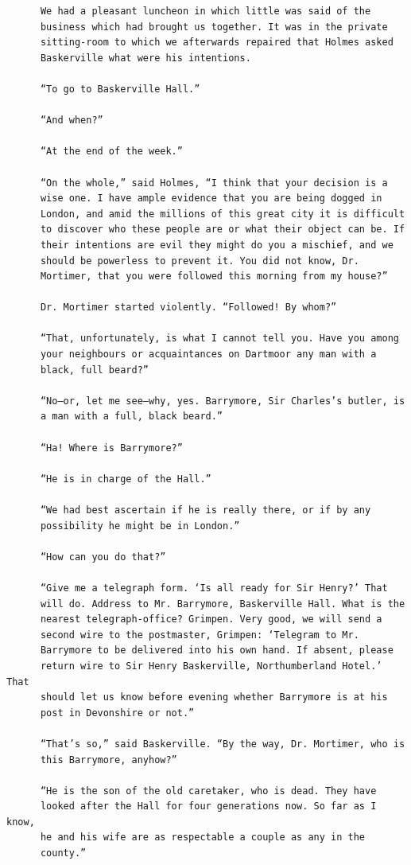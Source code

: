 \documentclass{article}
\begin{document}
\begin{verbatim}
      We had a pleasant luncheon in which little was said of the
      business which had brought us together. It was in the private
      sitting-room to which we afterwards repaired that Holmes asked
      Baskerville what were his intentions.

      “To go to Baskerville Hall.”

      “And when?”

      “At the end of the week.”

      “On the whole,” said Holmes, “I think that your decision is a
      wise one. I have ample evidence that you are being dogged in
      London, and amid the millions of this great city it is difficult
      to discover who these people are or what their object can be. If
      their intentions are evil they might do you a mischief, and we
      should be powerless to prevent it. You did not know, Dr.
      Mortimer, that you were followed this morning from my house?”

      Dr. Mortimer started violently. “Followed! By whom?”

      “That, unfortunately, is what I cannot tell you. Have you among
      your neighbours or acquaintances on Dartmoor any man with a
      black, full beard?”

      “No—or, let me see—why, yes. Barrymore, Sir Charles’s butler, is
      a man with a full, black beard.”

      “Ha! Where is Barrymore?”

      “He is in charge of the Hall.”

      “We had best ascertain if he is really there, or if by any
      possibility he might be in London.”

      “How can you do that?”

      “Give me a telegraph form. ‘Is all ready for Sir Henry?’ That
      will do. Address to Mr. Barrymore, Baskerville Hall. What is the
      nearest telegraph-office? Grimpen. Very good, we will send a
      second wire to the postmaster, Grimpen: ‘Telegram to Mr.
      Barrymore to be delivered into his own hand. If absent, please
      return wire to Sir Henry Baskerville, Northumberland Hotel.’ That
      should let us know before evening whether Barrymore is at his
      post in Devonshire or not.”

      “That’s so,” said Baskerville. “By the way, Dr. Mortimer, who is
      this Barrymore, anyhow?”

      “He is the son of the old caretaker, who is dead. They have
      looked after the Hall for four generations now. So far as I know,
      he and his wife are as respectable a couple as any in the
      county.”


\end{verbatim}
\end{document}
